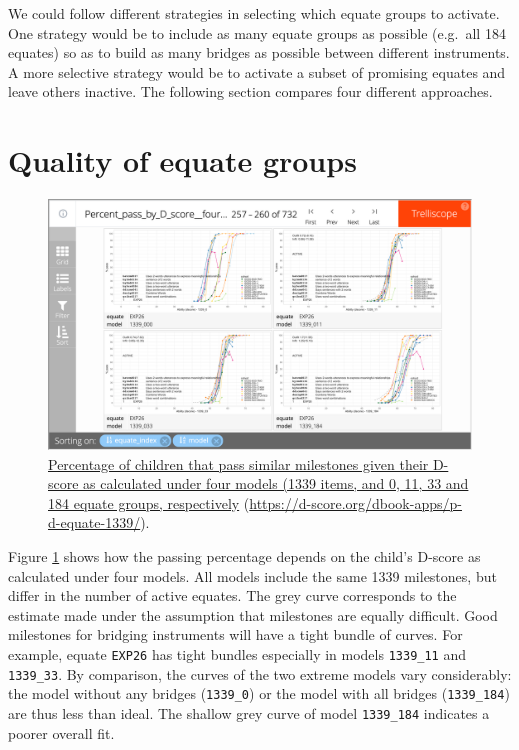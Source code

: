\documentclass[
]{book}
\begin{document}
We could follow different strategies in selecting which equate groups to activate. One strategy would be to include as many equate groups as possible (e.g.~all 184 equates) so as to build as many bridges as possible between different instruments. A more selective strategy would be to activate a subset of promising equates and leave others inactive. The following section compares four different approaches.

\hypertarget{sec:equatequality}{%
\section{Quality of equate groups}\label{sec:equatequality}}

\begin{figure}

{\centering \includegraphics[width=1\linewidth]{fig/fig_5.4} 

}

\caption{\href{https://d-score.org/dbook-apps/p-d-equate-1339/\#display=Percent_pass_by_D_score__four_models\&nrow=2\&ncol=2\&arr=row\&pg=65\&labels=equate,model\&sort=equate_index;asc,model;asc\&filter=\&sidebar=\&fv=}{Percentage of children that pass similar milestones given their D-score as calculated under four models (1339 items, and 0, 11, 33 and 184 equate groups, respectively} (\url{https://d-score.org/dbook-apps/p-d-equate-1339/}).}\label{fig:p-d-equate-1339}
\end{figure}



Figure \ref{fig:p-d-equate-1339} shows how the passing percentage depends on the child's D-score as calculated under four models. All models include the same 1339 milestones, but differ in the number of active equates. The grey curve corresponds to the estimate made under the assumption that milestones are equally difficult. Good milestones for bridging instruments will have a tight bundle of curves. For example, equate \texttt{EXP26} has tight bundles especially in models \texttt{1339\_11} and \texttt{1339\_33}. By comparison, the curves of the two extreme models vary considerably: the model without any bridges (\texttt{1339\_0}) or the model with all bridges (\texttt{1339\_184}) are thus less than ideal. The shallow grey curve of model \texttt{1339\_184} indicates a poorer overall fit.
\end{document}
